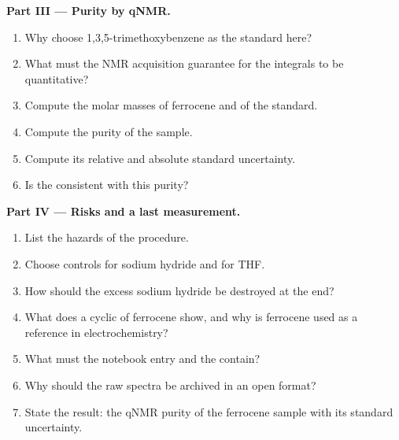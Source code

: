 \begin{problem}
\medskip\noindent\textbf{Part III --- Purity by qNMR.}
\begin{enumerate}[resume]
  \item Why choose 1,3,5-trimethoxybenzene as the standard here?
  \item What must the NMR acquisition guarantee for the integrals to be quantitative?
  \item Compute the molar masses of ferrocene and of the standard.
  \item Compute the purity of the sample.
  \item Compute its relative and absolute standard uncertainty.
  \item Is the  consistent with this purity?
\end{enumerate}

\medskip\noindent\textbf{Part IV --- Risks and a last measurement.}
\begin{enumerate}[resume]
  \item List the hazards of the procedure.
  \item Choose controls for sodium hydride and for THF.
  \item How should the excess sodium hydride be destroyed at the end?
  \item What does a cyclic  of ferrocene show, and why is ferrocene used
        as a reference in electrochemistry?
  \item What must the notebook entry and the  contain?
  \item Why should the raw spectra be archived in an open format?
  \item State the result: the qNMR purity of the ferrocene sample with its standard
        uncertainty.
\end{enumerate}
\end{problem}
